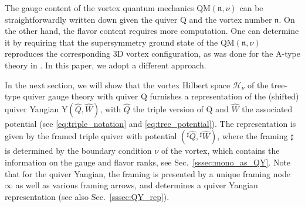 \documentclass[12pt,a4paper]{article}
\newcommand{\nn}{\mathfrak{n}}
\renewcommand{\(}{\left(}
\renewcommand{\)}{\right)}
\renewcommand{\(}{\left(}
\renewcommand{\)}{\right)}
\begin{document}
\medskip

The gauge content of the vortex quantum mechanics QM$(\nn,\nu)$ can be straightforwardly written down given the quiver $\mathrm{Q}$ and the vortex number $\nn$.
On the other hand, the flavor content requires more computation. 
One can determine it by requiring that the supersymmetry ground state of the QM$(\nn,\nu)$ reproduces the corresponding 3D vortex configuration, as was done for the A-type theory in \cite{Bullimore:2016hdc}.
In this paper, we adopt a different approach. 

\medskip

In the next section, we will show that the vortex Hilbert space $\mathcal{H}_\nu$ of the tree-type quiver gauge theory with quiver $\mathrm{Q}$ furnishes a representation of the (shifted) quiver Yangian Y$(\widehat{Q},\widehat{W})$, with $\widehat{Q}$ the triple version of $\mathrm{Q}$ and $\widehat{W}$ the associated potential (see \eqref{eq:triple_notation} and \eqref{eq:tree_potential}). 
The representation is given by the framed triple quiver with potential $({}^{\sharp}\widehat{Q},{}^{\sharp}\widehat{W})$, where the framing $\sharp$ is determined by the boundary condition $\nu$ of the vortex, which contains the information on the gauge and flavor ranks, see Sec.~\ref{sssec:mono_as_QY}. Note that for the quiver Yangian, the framing is presented by a unique framing node $\infty$ as well as various framing arrows, and determines a quiver Yangian representation \cite{Li:2023zub} (see also Sec.~\ref{sssec:QY_rep}).
\end{document}
